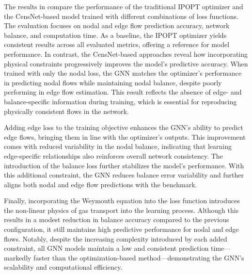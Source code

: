 The results in  compare the performance of the traditional IPOPT optimizer and the CensNet-based model trained with different combinations of loss functions. The evaluation focuses on nodal and edge flow prediction accuracy, network balance, and computation time. As a baseline, the IPOPT optimizer yields consistent results across all evaluated metrics, offering a reference for model performance. In contrast, the CensNet-based approaches reveal how incorporating physical constraints progressively improves the model's predictive accuracy. When trained with only the nodal loss, the GNN matches the optimizer's performance in predicting nodal flows while maintaining nodal balance, despite poorly performing in edge flow estimation. This result reflects the absence of edge- and balance-specific information during training, which is essential for reproducing physically consistent flows in the network.

Adding edge loss to the training objective enhances the GNN’s ability to predict edge flows, bringing them in line with the optimizer’s outputs. This improvement comes with reduced variability in the nodal balance, indicating that learning edge-specific relationships also reinforces overall network consistency. The introduction of the balance loss further stabilizes the model’s performance. With this additional constraint, the GNN reduces balance error variability and further aligns both nodal and edge flow predictions with the benchmark.

Finally, incorporating the Weymouth equation into the loss function introduces the non-linear physics of gas transport into the learning process. Although this results in a modest reduction in balance accuracy compared to the previous configuration, it still maintains high predictive performance for nodal and edge flows. Notably, despite the increasing complexity introduced by each added constraint, all GNN models maintain a low and consistent prediction time—markedly faster than the optimization-based method—demonstrating the GNN’s scalability and computational efficiency.



